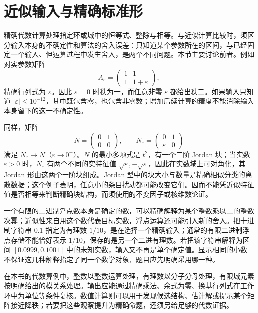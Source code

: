 
%
%

\section{近似输入与精确标准形}
\label{b2:sec:A03}

精确代数计算处理指定环或域中的恒等式、整除与相等。与近似计算比较时，须区分输入本身的不确定性和算法的舍入误差：只知道某个参数所在的区间，与已经固定一个输入、但运算过程中发生舍入，是两个不同问题。本节主要讨论前者。例如对实参数矩阵
\[
	A_\varepsilon=\begin{pmatrix}1&1\\1&1+\varepsilon\end{pmatrix},
\]
精确行列式为 \(\varepsilon\)。因此 \(\varepsilon=0\) 时秩为一，而任意非零 \(\varepsilon\) 都给出秩二。如果输入只知道 \(|\varepsilon|\le10^{-12}\)，其中既包含零，也包含非零数；增加后续计算的精度不能消除输入本身留下的这一不确定性。

\ProseParagraphBreak
同样，矩阵
\[
	N=\begin{pmatrix}0&1\\0&0\end{pmatrix},\qquad
	N_\varepsilon=\begin{pmatrix}0&1\\\varepsilon&0\end{pmatrix}
\]
满足 \(N_\varepsilon\to N\)（\(\varepsilon\to0^+\)）。\(N\) 的最小多项式是 \(t^2\)，有一个二阶 Jordan 块；当实数 \(\varepsilon>0\) 时，\(N_\varepsilon\) 有两个不同的实特征值 \(\sqrt\varepsilon,-\sqrt\varepsilon\)，因此在实数域上可对角化，其 Jordan 形由这两个一阶块组成。Jordan 型中的块大小与数量是精确相似分类的离散数据；这个例子表明，任意小的条目扰动都可能改变它们。因而不能凭近似特征值是否相等来判断精确块结构，而须使用的不变因子或核维数论证。

\ProseParagraphBreak
一个有限的二进制浮点数本身是确定的数，可以精确解释为某个整数乘以二的整数次幂；近似性来自用这个数代表目标实数，浮点运算还可能引入新的舍入。把十进制字符串 \(0.1\) 指定为有理数 \(1/10\)，是在选择一个精确输入；通常的有限二进制浮点存储不能恰好表示 \(1/10\)，保存的是另一个二进有理数。若把该字符串解释为区间 \([0.0999,0.1001]\) 中的未知实数，输入又不再是单个确定值。显示相同的小数不保证这几种解释指定了同一个数学对象，题目应先明确采用哪一种。

\ProseParagraphBreak
在本书的代数算例中，整数以整数运算处理，有理数以分子分母处理，有限域元素按明确给出的模关系处理。输出应能通过精确乘法、余式为零、换基行列式在工作环中为单位等条件复核。数值计算则可以用于发现候选结构、估计解或提示某个矩阵接近降秩；若要把这些观察提升为精确命题，还须另给足够的代数证据。
